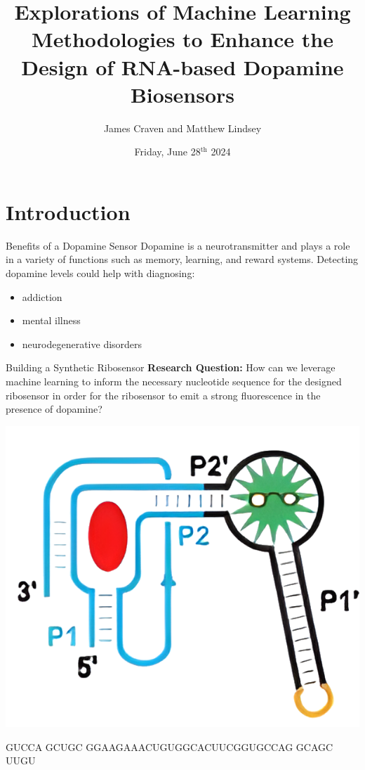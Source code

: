 \documentclass[9pt, dvipsnames]{beamer}
\title[ML in Synth. Bio.]{Explorations of Machine Learning Methodologies to Enhance the Design of RNA-based Dopamine Biosensors}
\author[Abernathys' Group]{James Craven and Matthew Lindsey}
\date{Friday, June 28$^{\text{th}}$ 2024}
\begin{document}
\maketitle

\section{Introduction}
\begin{frame}{Benefits of a Dopamine Sensor}
Dopamine is a neurotransmitter and plays a role in a variety of functions
such as memory, learning, and reward systems. Detecting dopamine levels
could help with diagnosing:
    \begin{itemize}
        \item addiction
        \item mental illness
        \item neurodegenerative disorders
    \end{itemize}
\end{frame}

\begin{frame}{Building a Synthetic Ribosensor}
\textbf{Research Question:} How can we leverage machine learning to inform the
necessary nucleotide sequence for the designed ribosensor in order for the ribosensor
to emit a strong fluorescence in the presence of dopamine?
\begin{center}
\includegraphics[height=0.3\paperheight]{assets/ribo3.png}
\end{center}
    \small
    \color{ForestGreen}\textellipsis GUCCA
    \color{black} GCUGC 
    \color{cyan} GGAAGAAACUGUGGCACUUCGGUGCCAG
    \color{black} GCAGC
    \color{ForestGreen} UUGU\textellipsis
\end{frame}
\end{document}
